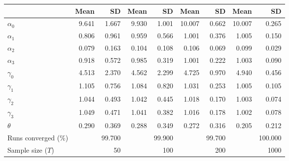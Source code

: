 
\begin{tabular}[t]{lrrrrrrrr}
\toprule
  & Mean & SD & Mean  & SD  & Mean   & SD   & Mean    & SD   \\
\midrule
$\alpha_{0}$ & 9.641 & 1.667 & 9.930 & 1.001 & 10.007 & 0.662 & 10.007 & 0.265\\
$\alpha_{1}$ & 0.806 & 0.961 & 0.959 & 0.566 & 1.001 & 0.376 & 1.005 & 0.150\\
$\alpha_{2}$ & 0.079 & 0.163 & 0.104 & 0.108 & 0.106 & 0.069 & 0.099 & 0.029\\
$\alpha_{3}$ & 0.918 & 0.572 & 0.985 & 0.319 & 1.001 & 0.222 & 1.003 & 0.090\\
$\gamma_{0}$ & 4.513 & 2.370 & 4.562 & 2.299 & 4.725 & 0.970 & 4.940 & 0.456\\
$\gamma_{1}$ & 1.105 & 0.756 & 1.084 & 0.820 & 1.031 & 0.253 & 1.005 & 0.105\\
$\gamma_{2}$ & 1.044 & 0.493 & 1.042 & 0.445 & 1.018 & 0.170 & 1.003 & 0.074\\
$\gamma_{3}$ & 1.049 & 0.471 & 1.041 & 0.382 & 1.016 & 0.178 & 1.002 & 0.078\\
$\theta$ & 0.290 & 0.369 & 0.288 & 0.349 & 0.272 & 0.316 & 0.205 & 0.212\\
Runs converged (\%) &  & 99.700 &  & 99.900 &  & 99.700 &  & 100.000\\
Sample size ($T$) &  & 50 &  & 100 &  & 200 &  & 1000\\
\bottomrule
\end{tabular}
